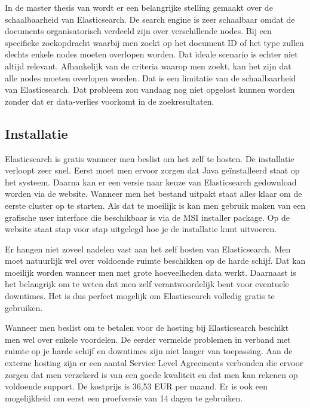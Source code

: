 In de master thesis van \textcite{Berglund2013} wordt er een belangrijke stelling gemaakt over de schaalbaarheid van Elasticsearch. De search engine is zeer schaalbaar omdat de documents organisatorisch verdeeld zijn over verschillende nodes. Bij een specifieke zoekopdracht waarbij men zoekt op het document ID of het type zullen slechts enkele nodes moeten overlopen worden. Dat ideale scenario is echter niet altijd relevant. Afhankelijk van de criteria waarop men zoekt, kan het zijn dat alle nodes moeten overlopen worden. Dat is een limitatie van de schaalbaarheid van Elasticsearch. Dat probleem zou vandaag nog niet opgelost kunnen worden zonder dat er data-verlies voorkomt in de zoekresultaten. 

\subsection{Installatie}
\label{Installatie}

Elasticsearch is gratis wanneer men beslist om het zelf te hosten. De installatie verloopt zeer snel. Eerst moet men ervoor zorgen dat Java geïnstalleerd staat op het systeem. Daarna kan er een versie naar keuze van Elasticsearch gedownload worden via de website. Wanneer men het bestand uitpakt staat alles klaar om de eerste cluster op te starten. Als dat te moeilijk is kan men gebruik maken van een grafische user interface die beschikbaar is via de MSI installer package. Op de website staat stap voor stap uitgelegd hoe je de installatie kunt uitvoeren. 

Er hangen niet zoveel nadelen vast aan het zelf hosten van Elasticsearch. Men moet natuurlijk wel over voldoende ruimte beschikken op de harde schijf. Dat kan moeilijk worden wanneer men met grote hoeveelheden data werkt. Daarnaast is het belangrijk om te weten dat men zelf verantwoordelijk bent voor eventuele downtimes. Het is dus perfect mogelijk om Elasticsearch volledig gratis te gebruiken. 

Wanneer men beslist om te betalen voor de hosting bij Elasticsearch beschikt men wel over enkele voordelen. De eerder vermelde problemen in verband met ruimte op je harde schijf en downtimes zijn niet langer van toepassing. Aan de externe hosting zijn er een aantal Service Level Agreements verbonden die ervoor zorgen dat men verzekerd is van een goede kwaliteit en dat men kan rekenen op voldoende support. De kostprijs is 36,53 EUR per maand. Er is ook een mogelijkheid om eerst een proefversie van 14 dagen te gebruiken.

